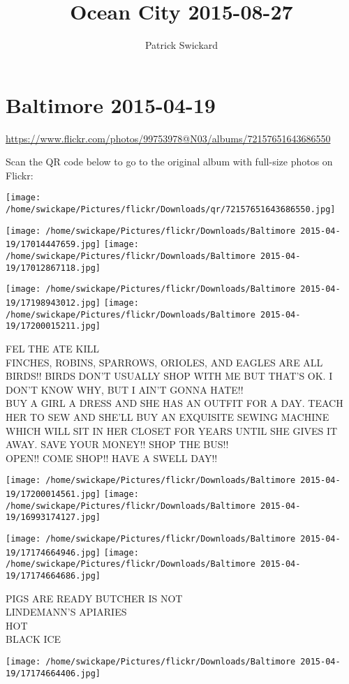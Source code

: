 \documentclass[10pt,letterpaper]{article}
\title{Ocean City 2015-08-27}
\author{Patrick Swickard}
\date{}
\begin{document}
\section*{Baltimore 2015-04-19}

\url{https://www.flickr.com/photos/99753978@N03/albums/72157651643686550}

Scan the QR code below to go to the original album with full-size photos on Flickr:

\texttt{[image: /home/swickape/Pictures/flickr/Downloads/qr/72157651643686550.jpg]}
\pagebreak

\texttt{[image: /home/swickape/Pictures/flickr/Downloads/Baltimore 2015-04-19/17014447659.jpg]}
\texttt{[image: /home/swickape/Pictures/flickr/Downloads/Baltimore 2015-04-19/17012867118.jpg]}

\texttt{[image: /home/swickape/Pictures/flickr/Downloads/Baltimore 2015-04-19/17198943012.jpg]}
\texttt{[image: /home/swickape/Pictures/flickr/Downloads/Baltimore 2015-04-19/17200015211.jpg]}

FEL THE ATE KILL\\
FINCHES, ROBINS, SPARROWS, ORIOLES, AND EAGLES ARE ALL BIRDS!!  BIRDS DON'T USUALLY SHOP WITH ME BUT THAT'S OK.  I DON'T KNOW WHY, BUT I AIN'T GONNA HATE!!\\
BUY A GIRL A DRESS AND SHE HAS AN OUTFIT FOR A DAY.  TEACH HER TO SEW AND SHE'LL BUY AN EXQUISITE SEWING MACHINE WHICH WILL SIT IN HER CLOSET FOR YEARS UNTIL SHE GIVES IT AWAY.  SAVE YOUR MONEY!! SHOP THE BUS!!\\
OPEN!! COME SHOP!! HAVE A SWELL DAY!!
\pagebreak

\texttt{[image: /home/swickape/Pictures/flickr/Downloads/Baltimore 2015-04-19/17200014561.jpg]}
\texttt{[image: /home/swickape/Pictures/flickr/Downloads/Baltimore 2015-04-19/16993174127.jpg]}

\texttt{[image: /home/swickape/Pictures/flickr/Downloads/Baltimore 2015-04-19/17174664946.jpg]}
\texttt{[image: /home/swickape/Pictures/flickr/Downloads/Baltimore 2015-04-19/17174664686.jpg]}

PIGS ARE READY BUTCHER IS NOT\\
LINDEMANN'S APIARIES\\
HOT\\
BLACK ICE
\pagebreak

\texttt{[image: /home/swickape/Pictures/flickr/Downloads/Baltimore 2015-04-19/17174664406.jpg]}
\end{document}
